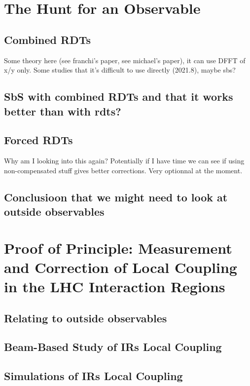 \section{The Hunt for an Observable}

\subsection{Combined RDTs}

Some theory here (see franchi's paper, see michael's paper), it can use DFFT of x/y only.
Some studies that it's difficult to use directly (2021.8), maybe sbs?

\subsection{SbS with combined RDTs and that it works better than with rdts?}

\subsection{Forced RDTs}

Why am I looking into this again?
Potentially if I have time we can see if using non-compensated stuff gives better corrections.
Very optionnal at the moment.

\subsection{Conclusioon that we might need to look at outside observables}


\section{Proof of Principle: Measurement and Correction of Local Coupling in the LHC Interaction Regions}

\subsection{Relating to outside observables}

\subsection{Beam-Based Study of IRs Local Coupling}

\subsection{Simulations of IRs Local Coupling}

